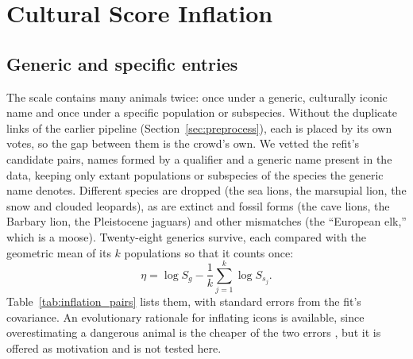\documentclass[11pt]{article}
\begin{document}
\section{Cultural Score Inflation}
\label{sec:inflation}

\subsection{Generic and specific entries}
The scale contains many animals twice: once under a generic, culturally iconic name and once under a specific population or subspecies. Without the duplicate links of the earlier pipeline (Section~\ref{sec:preprocess}), each is placed by its own votes, so the gap between them is the crowd's own. We vetted the refit's candidate pairs, names formed by a qualifier and a generic name present in the data, keeping only extant populations or subspecies of the species the generic name denotes. Different species are dropped (the sea lions, the marsupial lion, the snow and clouded leopards), as are extinct and fossil forms (the cave lions, the Barbary lion, the Pleistocene jaguars) and other mismatches (the ``European elk,'' which is a moose). Twenty-eight generics survive, each compared with the geometric mean of its $k$ populations so that it counts once:
\begin{equation}
\eta=\log S_g-\frac1k\sum_{j=1}^{k}\log S_{s_j} .
\end{equation}
Table~\ref{tab:inflation_pairs} lists them, with standard errors from the fit's covariance. An evolutionary rationale for inflating icons is available, since overestimating a dangerous animal is the cheaper of the two errors \cite{haselton2006paranoid}, but it is offered as motivation and is not tested here.
\end{document}
